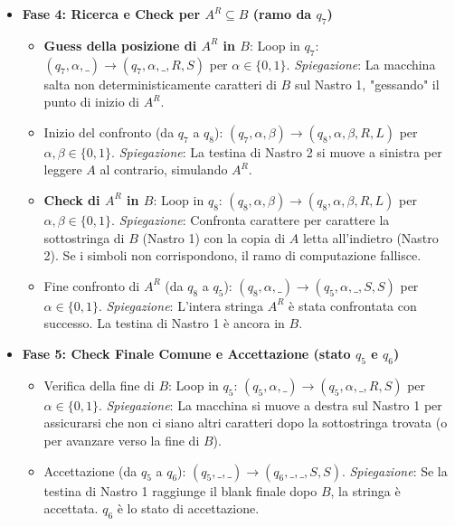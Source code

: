 \documentclass[a4paper]{article}
\begin{document}
\begin{itemize}
    \item \textbf{Fase 4: Ricerca e Check per $A^R \subseteq B$ (ramo da $q_7$)}
        \begin{itemize}
            \item \textbf{Guess della posizione di $A^R$ in $B$}: Loop in $q_7$:
                $(q_7, \alpha, \text{\_}) \to (q_7, \alpha, \text{\_}, R, S)$ per $\alpha \in \{0, 1\}$.
                \textit{Spiegazione}: La macchina salta non deterministicamente caratteri di $B$ sul Nastro 1, "gessando" il punto di inizio di $A^R$.
            \item Inizio del confronto (da $q_7$ a $q_8$):
                $(q_7, \alpha, \beta) \to (q_8, \alpha, \beta, R, L)$ per $\alpha, \beta \in \{0, 1\}$.
                \textit{Spiegazione}: La testina di Nastro 2 si muove a sinistra per leggere $A$ al contrario, simulando $A^R$.
            \item \textbf{Check di $A^R$ in $B$}: Loop in $q_8$:
                $(q_8, \alpha, \beta) \to (q_8, \alpha, \beta, R, L)$ per $\alpha, \beta \in \{0, 1\}$.
                \textit{Spiegazione}: Confronta carattere per carattere la sottostringa di $B$ (Nastro 1) con la copia di $A$ letta all'indietro (Nastro 2). Se i simboli non corrispondono, il ramo di computazione fallisce.
            \item Fine confronto di $A^R$ (da $q_8$ a $q_5$):
                $(q_8, \alpha, \text{\_}) \to (q_5, \alpha, \text{\_}, S, S)$ per $\alpha \in \{0, 1\}$.
                \textit{Spiegazione}: L'intera stringa $A^R$ è stata confrontata con successo. La testina di Nastro 1 è ancora in $B$.
        \end{itemize}
    \item \textbf{Fase 5: Check Finale Comune e Accettazione (stato $q_5$ e $q_6$)}
        \begin{itemize}
            \item Verifica della fine di $B$: Loop in $q_5$:
                $(q_5, \alpha, \text{\_}) \to (q_5, \alpha, \text{\_}, R, S)$ per $\alpha \in \{0, 1\}$.
                \textit{Spiegazione}: La macchina si muove a destra sul Nastro 1 per assicurarsi che non ci siano altri caratteri dopo la sottostringa trovata (o per avanzare verso la fine di $B$).
            \item Accettazione (da $q_5$ a $q_6$):
                $(q_5, \text{\_}, \text{\_}) \to (q_6, \text{\_}, \text{\_}, S, S)$.
                \textit{Spiegazione}: Se la testina di Nastro 1 raggiunge il blank finale dopo $B$, la stringa è accettata. $q_6$ è lo stato di accettazione.
        \end{itemize}
\end{itemize}
\end{document}
